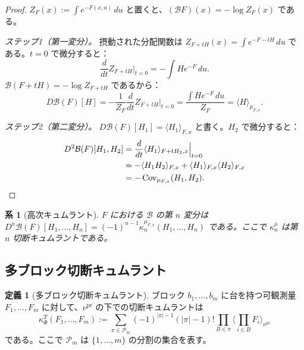 \documentclass[12pt]{article}
\theoremstyle{plain}
\newtheorem{corollary}[theorem]{系}
\theoremstyle{definition}
\newtheorem{definition}[theorem]{定義}
\numberwithin{equation}{section}
\newcommand{\Cov}{\operatorname{Cov}}
\newcommand{\pr}{\mathrm{pr}}
\begin{document}
\begin{proof}
$Z_F(x):=\int e^{-F(x,u)}\,du$ と置くと、$(\mathcal{B}F)(x)=-\log Z_F(x)$ である。

\emph{ステップ1（第一変分）。} 摂動された分配関数は $Z_{F+tH}(x)=\int e^{-F-tH}\,du$ である。$t=0$ で微分すると：
\begin{equation}
\frac{d}{dt}Z_{F+tH}\Big|_{t=0} = -\int He^{-F}\,du.
\end{equation}
$\mathcal{B}(F+tH)=-\log Z_{F+tH}$ であるから：
\begin{equation}
D\mathcal{B}(F)[H] = -\frac{1}{Z_F}\frac{d}{dt}Z_{F+tH}\Big|_{t=0} = \frac{\int He^{-F}\,du}{Z_F} = \langle H\rangle_{\mu_{F,x}}.
\end{equation}

\emph{ステップ2（第二変分）。} $D\mathcal{B}(F)[H_1]=\langle H_1\rangle_{F,x}$ と書く。$H_2$ で微分すると：
\begin{align}
D^2\mathcal{B}(F)[H_1,H_2] &= \frac{d}{dt}\langle H_1\rangle_{F+tH_2,x}\Big|_{t=0}\\
&= -\langle H_1 H_2\rangle_{F,x} + \langle H_1\rangle_{F,x}\langle H_2\rangle_{F,x}\\
&= -\Cov_{\mu_{F,x}}(H_1,H_2).\qedhere
\end{align}
\end{proof}

\begin{corollary}[高次キュムラント]\label{cor:highercumulants}
$F$ における $\mathcal{B}$ の第 $n$ 変分は $D^n\mathcal{B}(F)[H_1,\ldots,H_n]=(-1)^{n-1}\kappa_n^{\mu_{F,x}}(H_1,\ldots,H_n)$ である。ここで $\kappa_n^\mu$ は第 $n$ 切断キュムラントである。
\end{corollary}

\subsection{多ブロック切断キュムラント}

\begin{definition}[多ブロック切断キュムラント]
ブロック $b_1,\ldots,b_m$ に台を持つ可観測量 $F_1,\ldots,F_m$ に対して、$\nu^{\pr}$ の下での切断キュムラントは
\begin{equation}
\kappa_\Phi^T(F_1,\ldots,F_m) := \sum_{\pi\in\mathcal{P}_m}(-1)^{|\pi|-1}(|\pi|-1)!\prod_{B\in\pi}\Big\langle\prod_{i\in B}F_i\Big\rangle_{\nu^{\pr}}
\end{equation}
である。ここで $\mathcal{P}_m$ は $\{1,\ldots,m\}$ の分割の集合を表す。
\end{definition}
\end{document}
